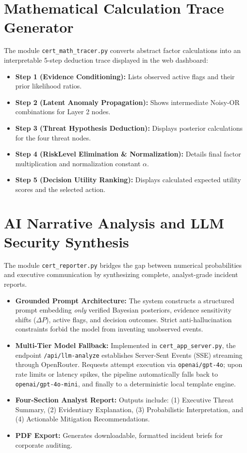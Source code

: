\documentclass[12pt,a4paper]{report}
\begin{document}
\section{Mathematical Calculation Trace Generator}
The module \texttt{cert\_math\_tracer.py} converts abstract factor calculations into an interpretable 5-step deduction trace displayed in the web dashboard:
\begin{itemize}
    \item \textbf{Step 1 (Evidence Conditioning):} Lists observed active flags and their prior likelihood ratios.
    \item \textbf{Step 2 (Latent Anomaly Propagation):} Shows intermediate Noisy-OR combinations for Layer 2 nodes.
    \item \textbf{Step 3 (Threat Hypothesis Deduction):} Displays posterior calculations for the four threat nodes.
    \item \textbf{Step 4 (RiskLevel Elimination \& Normalization):} Details final factor multiplication and normalization constant $\alpha$.
    \item \textbf{Step 5 (Decision Utility Ranking):} Displays calculated expected utility scores and the selected action.
\end{itemize}

\section{AI Narrative Analysis and LLM Security Synthesis}
The module \texttt{cert\_reporter.py} bridges the gap between numerical probabilities and executive communication by synthesizing complete, analyst-grade incident reports.
\begin{itemize}
    \item \textbf{Grounded Prompt Architecture:} The system constructs a structured prompt embedding \textit{only} verified Bayesian posteriors, evidence sensitivity shifts ($\Delta P$), active flags, and decision outcomes. Strict anti-hallucination constraints forbid the model from inventing unobserved events.
    \item \textbf{Multi-Tier Model Fallback:} Implemented in \texttt{cert\_app\_server.py}, the endpoint \texttt{/api/llm-analyze} establishes Server-Sent Events (SSE) streaming through OpenRouter. Requests attempt execution via \texttt{openai/gpt-4o}; upon rate limits or latency spikes, the pipeline automatically falls back to \texttt{openai/gpt-4o-mini}, and finally to a deterministic local template engine.
    \item \textbf{Four-Section Analyst Report:} Outputs include: (1) Executive Threat Summary, (2) Evidentiary Explanation, (3) Probabilistic Interpretation, and (4) Actionable Mitigation Recommendations.
    \item \textbf{PDF Export:} Generates downloadable, formatted incident briefs for corporate auditing.
\end{itemize}
\end{document}
